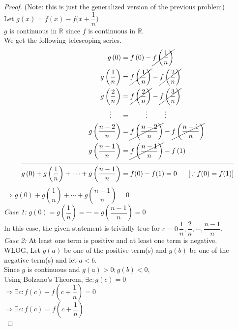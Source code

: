 \documentclass[14]{article}
\theoremstyle{definition}
\begin{document}
\begin{proof}
(Note: this is just the generalized version of the previous problem)\\
Let $g(x) = f(x) - f\Big(x + \dfrac{1}{n}\Big)$\\
$g$ is continuous in $\mathbb{R}$ since $f$ is continuous in $\mathbb{R}$.\\
We get the following telescoping series.
\begin{align*}
g\left(0\right) &= f\left(0\right) - \cancel{f\left(\dfrac{1}{n}\right)}\\
g\left(\dfrac{1}{n}\right) &= \cancel{f\left(\dfrac{1}{n}\right)} - \cancel{f\left(\dfrac{2}{n}\right)}\\
g\left(\dfrac{2}{n}\right) &= \cancel{f\left(\dfrac{2}{n}\right)} -\cancel{f\left(\dfrac{3}{n}\right)}\\
\vdots\;\;\;\;\; &=\;\;\;\;\;\;\;\;\vdots \;\;\;\;\;\;\;\;\; \vdots\\
g\left(\dfrac{n - 2}{n}\right) &= \cancel{f\left(\dfrac{n - 2}{n}\right)} - \cancel{f\left(\dfrac{n - 1}{n}\right)}\\
g\left(\dfrac{n - 1}{n}\right) &= \cancel{f\left(\dfrac{n - 1}{n}\right)} - f\left(1\right)\\
\cline{1-2}
g\left(0\right) + g\left(\dfrac{1}{n}\right) + \cdots + g\left(\dfrac{n - 1}{n}\right) &= f(0) - f(1) = 0 \;\;\;\;\;\; [\because f(0) = f(1)]
\end{align*}
$\Rightarrow g\left(0\right) + g\left(\dfrac{1}{n}\right) + \cdots + g\left(\dfrac{n - 1}{n}\right) = 0$\\
\textit{Case 1:} $g\left(0\right) = g\left(\dfrac{1}{n}\right) = \cdots = g\left(\dfrac{n - 1}{n}\right)= 0$\\
In this case, the given statement is trivially true for $c = 0\, \dfrac{1}{n}, \dfrac{2}{n}, \cdots, \dfrac{n-1}{n}$.\\
\textit{Case 2:} At least one term is positive and at least one term is negative.\\
WLOG, Let $g(a)$ be one of the positive term(s) and $g(b)$ be one of the negative term(s) and let $a < b$.\\
Since $g$ is continuous and $g(a) > 0; g(b) < 0$,\\ Using Bolzano's Theorem, $\exists c : g(c) = 0$\\
$\Rightarrow \exists c : f(c) - f\left(c + \dfrac{1}{n}\right) = 0$\\
$\Rightarrow \exists c : f(c) = f\left(c + \dfrac{1}{n}\right)$\\
\end{proof}
\pagebreak
\end{document}

